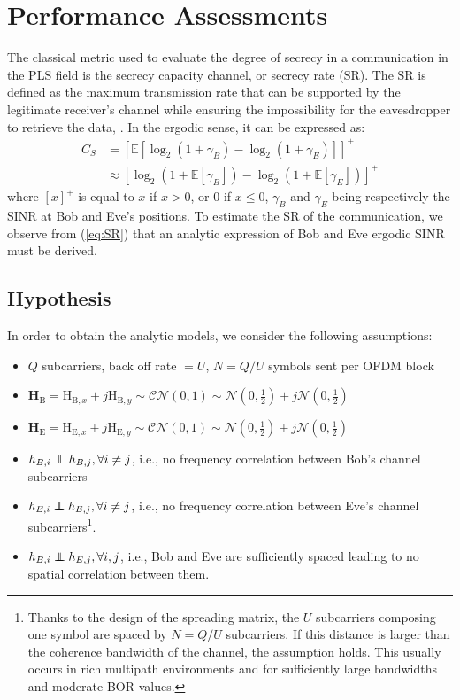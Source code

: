 \documentclass[journal,comsoc]{IEEEtran}
\newcommand{\EX}[1]{\mathbb{E} \left[#1\right]}%
\newcommand{\HE}{\textbf{H}_{\text{E}}}
\newcommand{\HB}{\textbf{H}_{\text{B}}}
\newcommand{\mat}[1]{\boldsymbol{\mathrm{#1}}}
\newcommand\independent{\protect\mathpalette{\protect\independenT}{\perp}}
\def\independenT#1#2{\mathrel{\rlap{$#1#2$}\mkern2mu{#1#2}}}
\begin{document}
\section{Performance Assessments}
\label{sec:perf}
The classical metric used to evaluate the degree of secrecy in a communication in the PLS field is the secrecy capacity channel, or secrecy rate (SR). The SR is defined as the maximum transmission rate that can be supported by the legitimate receiver's channel while ensuring the impossibility for the eavesdropper to retrieve the data, \cite{7348007}. In the ergodic sense, it can be expressed as:
\begin{equation}
\begin{split}
C_S &=  \left[\EX{\log_2{\left(1+\gamma_B\right)} - \log_2{\left(1+\gamma_E\right)}}\right]^+  \\
&\approx  \left[ \log_2 \left( 1+ \EX{\gamma_B} \right) - \log_2 \left( 1+ \EX{\gamma_E}\right)\right]^+
\end{split}
\label{eq:SR}
\end{equation}
where $\left[x\right]^+$ is equal to $x$ if $x>0$, or $0$ if $x \leq 0$,  $\gamma_B$ and $\gamma_E$ being respectively the SINR at Bob and Eve's positions. To estimate the SR of the communication, we observe from (\ref{eq:SR}) that an analytic expression of Bob and Eve ergodic SINR must be derived.




\subsection{Hypothesis}
In order to obtain the analytic models, we consider the following assumptions:
\begin{itemize}
	\item $Q$ subcarriers, back off rate $= U$, $N = Q/U$ symbols sent per OFDM block
	\item  $\HB = \mat{H}_{\text{B},x} + j\mat{H}_{\text{B},y} \sim \mathcal{CN}(0,1) \sim \mathcal{N}(0,\frac{1}{2}) + j \mathcal{N}(0,\frac{1}{2}) $
	\item  $\HE = \mat{H}_{\text{E},x} + j\mat{H}_{\text{E},y} \sim \mathcal{CN}(0,1) \sim \mathcal{N}(0,\frac{1}{2}) + j \mathcal{N}(0,\frac{1}{2}) $
	\item $h_{B,i} \independent h_{B,j}, \forall i \neq j$, i.e., no frequency correlation between Bob's channel subcarriers
	\item $h_{E,i} \independent h_{E,j}, \forall i \neq j$, i.e., no frequency correlation between Eve's channel subcarriers\footnote{Thanks to the design of the spreading matrix, the $U$ subcarriers composing one symbol are spaced by $N = Q/U$ subcarriers. If this distance is larger than the coherence bandwidth of the channel, the assumption holds. This usually occurs in rich multipath environments and for sufficiently large bandwidths and moderate BOR values.}.
	\item $h_{B,i} \independent h_{E,j}, \forall i,j$, i.e., Bob and Eve are sufficiently spaced leading to no spatial correlation between them.
\end{itemize}
\end{document}
